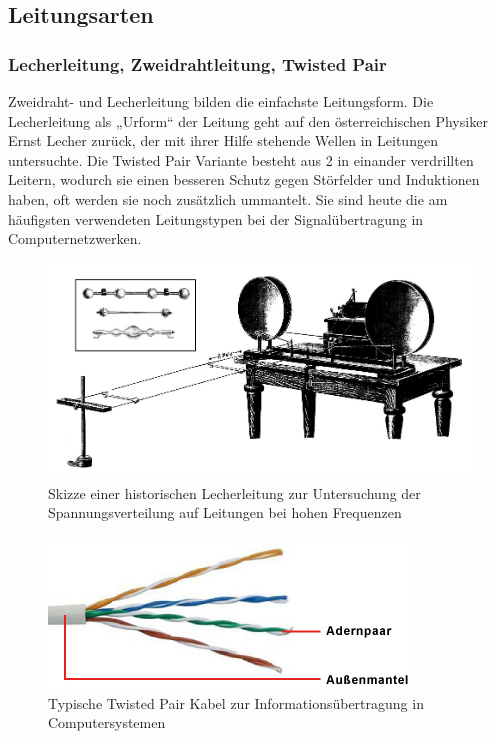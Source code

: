 \subsection{Leitungsarten} %
\label{sub:leitungsarten}

	\subsubsection{Lecherleitung, Zweidrahtleitung, Twisted Pair} %
	\label{ssub:lecherleitung_zweidrahtleitung_twisted_pair}
	
		Zweidraht- und Lecherleitung bilden die einfachste Leitungsform. 
		Die Lecherleitung als „Urform“ der Leitung geht auf den österreichischen Physiker Ernst Lecher zurück, der mit ihrer Hilfe stehende Wellen in Leitungen untersuchte. 
		Die Twisted Pair Variante besteht aus 2 in einander verdrillten Leitern, wodurch sie einen besseren Schutz gegen Störfelder und Induktionen haben, oft werden sie noch zusätzlich ummantelt. 
		Sie sind heute die am häufigsten verwendeten Leitungstypen bei der Signalübertragung in Computernetzwerken.

		\begin{figure}[H]
			\center
			\includegraphics[scale = 0.3]{messwerte/Early_Lecher_line.png}
			\caption{\centering Skizze einer historischen Lecherleitung zur Untersuchung der Spannungsverteilung auf Leitungen bei hohen Frequenzen \cite{lecher}} %
			\label{Early_Lecher_line}
		\end{figure}

		\begin{figure}[H]
			\center
			\includegraphics[scale = 0.6]{messwerte/twisted_pair.jpg}
			\caption{\centering Typische Twisted Pair Kabel zur Informationsübertragung in Computersystemen \cite{twisted}} %
			\label{twisted pair}
		\end{figure}

